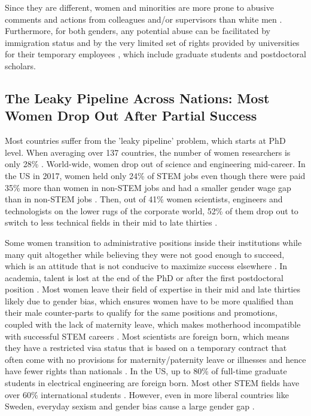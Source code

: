 \documentclass[utf8]{frontiersSCNS} %
\begin{document}
Since they are different, women and minorities are more prone to abusive comments and actions  from colleagues and/or supervisors than white men \citep{quinn2002sexual,hill2010so, Guardian, 2018Report}. Furthermore, for both genders, any potential abuse can be facilitated by immigration status and by the very limited set of rights provided by universities for their temporary employees  \citep{report02}, which include graduate students and postdoctoral scholars. %

\subsection{The Leaky Pipeline Across Nations: Most Women Drop Out After Partial Success}
\label{leaky}
Most countries suffer from the 'leaky pipeline' problem, which starts at PhD level. When averaging over 137 countries, the number of women researchers is only 28\% \citep{huyer2015gender}. World-wide,  women drop out of science and engineering mid-career. In the US in 2017, women held only 24\% of STEM jobs even though there were paid 35\% more than women in non-STEM jobs and had a smaller gender wage gap than in non-STEM jobs \citep{womenSTEM}. Then, out of 41\% women scientists, engineers and technologists on the lower rugs of the corporate world, 52\% of them drop out to switch to less technical fields in their mid to late thirties \citep{hewlett2008athena}. 

Some women transition to administrative positions inside their institutions while many quit altogether while believing they were not good enough to succeed, which is an attitude that is not conducive to maximize success elsewhere \citep{huyer2015gender, 2018Report}. In academia, talent is lost at the end of the PhD or after the first postdoctoral position \citep{2018Report}. Most women leave their field of expertise in their mid and late thirties likely due to gender bias, which ensures women have to be more qualified than their male counter-parts to qualify for the same positions and promotions, coupled with the lack of maternity leave, which makes motherhood incompatible with successful STEM careers \citep{corbett2015solving, huyer2015gender}. Most scientists are foreign born, which means they have a restricted visa status that is based on a temporary contract that often come with no provisions for maternity/paternity leave or illnesses and hence have fewer rights than nationals \citep{report02}. In the US, up to 80\% of full-time  graduate  students  in  electrical  engineering  are foreign born. Most other STEM fields have over 60\% international students \citep{anderson2013importance}. However, even in more liberal countries like Sweden, everyday sexism and gender bias cause a large gender gap \citep{Sweden}.
\end{document}
